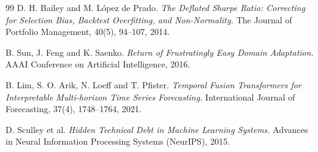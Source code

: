 \documentclass[11pt,a4paper]{article}
\begin{document}
\begin{thebibliography}{99}
D. H. Bailey and M. López de Prado.
\textit{The Deflated Sharpe Ratio: Correcting for Selection Bias, Backtest
Overfitting, and Non-Normality.}
The Journal of Portfolio Management, 40(5), 94--107, 2014.

B. Sun, J. Feng and K. Saenko.
\textit{Return of Frustratingly Easy Domain Adaptation.}
AAAI Conference on Artificial Intelligence, 2016.

B. Lim, S. O. Arik, N. Loeff and T. Pfister.
\textit{Temporal Fusion Transformers for Interpretable Multi-horizon Time Series
Forecasting.} International Journal of Forecasting, 37(4), 1748--1764, 2021.

D. Sculley et al. \textit{Hidden Technical Debt in Machine Learning Systems.}
Advances in Neural Information Processing Systems (NeurIPS), 2015.

\end{thebibliography}
\end{document}
